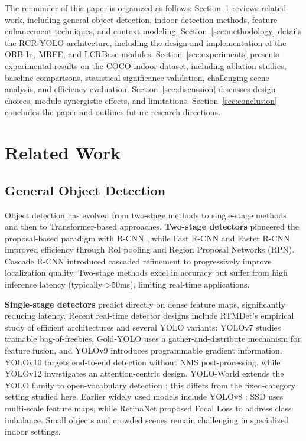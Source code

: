 \documentclass[journal]{IEEEtran}
\begin{document}
The remainder of this paper is organized as follows: Section~\ref{sec:related_work} reviews related work, including general object detection, indoor detection methods, feature enhancement techniques, and context modeling. Section~\ref{sec:methodology} details the RCR-YOLO architecture, including the design and implementation of the ORB-In, MRFE, and LCRBase modules. Section~\ref{sec:experiments} presents experimental results on the COCO-indoor dataset, including ablation studies, baseline comparisons, statistical significance validation, challenging scene analysis, and efficiency evaluation. Section~\ref{sec:discussion} discusses design choices, module synergistic effects, and limitations. Section~\ref{sec:conclusion} concludes the paper and outlines future research directions.

\section{Related Work}
\label{sec:related_work}

\subsection{General Object Detection}

Object detection has evolved from two-stage methods to single-stage methods and then to Transformer-based approaches. \textbf{Two-stage detectors} pioneered the proposal-based paradigm with R-CNN \cite{girshick2014rcnn}, while Fast R-CNN \cite{girshick2015fast} and Faster R-CNN \cite{ren2015faster} improved efficiency through RoI pooling and Region Proposal Networks (RPN). Cascade R-CNN \cite{cai2018cascade} introduced cascaded refinement to progressively improve localization quality. Two-stage methods excel in accuracy but suffer from high inference latency (typically >50ms), limiting real-time applications.

\textbf{Single-stage detectors} predict directly on dense feature maps, significantly reducing latency. Recent real-time detector designs include RTMDet's empirical study of efficient architectures \cite{lyu2022rtmdet} and several YOLO variants: YOLOv7 \cite{wang2022yolov7} studies trainable bag-of-freebies, Gold-YOLO \cite{wang2023goldyolo} uses a gather-and-distribute mechanism for feature fusion, and YOLOv9 \cite{wang2024yolov9} introduces programmable gradient information. YOLOv10 \cite{wang2024yolov10} targets end-to-end detection without NMS post-processing, while YOLOv12 \cite{tian2025yolov12} investigates an attention-centric design. YOLO-World extends the YOLO family to open-vocabulary detection \cite{chengqi2024yoloworld}; this differs from the fixed-category setting studied here. Earlier widely used models include YOLOv8 \cite{ultralytics2023yolov8}; SSD \cite{liu2016ssd} uses multi-scale feature maps, while RetinaNet \cite{lin2017focal} proposed Focal Loss to address class imbalance. Small objects and crowded scenes remain challenging in specialized indoor settings.
\end{document}
